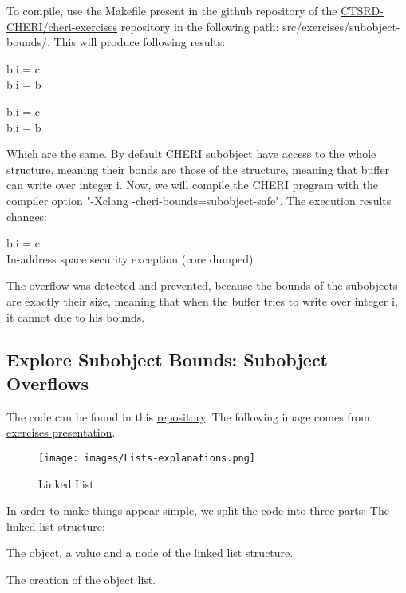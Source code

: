 \documentclass[a4paper, 11pt]{article}
\begin{document}
	To compile, use the Makefile present in the github repository of the \href{https://github.com/CTSRD-CHERI/cheri-exercises}{CTSRD-CHERI/cheri-exercises} repository in the following path: src/exercises/subobject-bounds/. 
	This will produce following results:
	\begin{tcolorbox}[colback=gray!5!white, colframe=gray!75!black, title=Output on a classic \Gls{risc-v} environment (no CHERI Protection)]
	b.i = c\\
	b.i = b
	\end{tcolorbox}
	\begin{tcolorbox}[colback=gray!5!white, colframe=blue!75!black, title=Output On an environment protected by CHERI]
		b.i = c\\
		b.i = b
	\end{tcolorbox}
	Which are the same. By default CHERI subobject have access to the whole structure, meaning their bonds are those of the structure, meaning that buffer can write over integer i. Now, we will compile the CHERI program with the compiler option "-Xclang -cheri-bounds=subobject-safe".
	The execution results changes:
	\begin{tcolorbox}[colback=gray!5!white, colframe=blue!75!black, title=Output On an environment protected by CHERI \& Subobject Protection]
		b.i = c\\
		In-address space security exception (core dumped)
	\end{tcolorbox}
	The overflow was detected and prevented, because the bounds of the subobjects are exactly their size, meaning that when the buffer tries to write over integer i, it cannot due to his bounds.
	


\subsection{Explore Subobject Bounds: Subobject Overflows}

The code can be found in this \href{https://ctsrd-cheri.github.io/cheri-exercises/exercises/subobject-bounds/}{repository}.
The following image comes from \href{https://ctsrd-cheri.github.io/cheri-exercises/exercises/subobject-bounds/subobject-bounds.pptx}{exercises presentation}.
\begin{figure}
\begin{minipage}{\linewidth}
	\texttt{[image: images/Lists-explanations.png]}
\end{minipage}
\caption{Linked List}
\end{figure}
In order to make things appear simple, we split the code into three parts:
The linked list structure:

The object, a value and a node of the linked list structure.

The creation of the object list.

\end{document}
